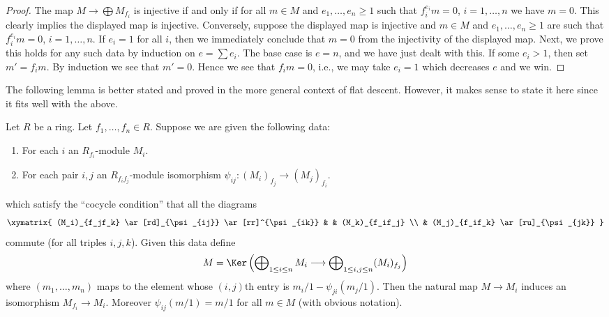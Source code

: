 \begin{proof}
The map $M \to \bigoplus M_{f_i}$ is injective if and only if
for all $m \in M$ and $e_1, \ldots, e_n \geq 1$ such that
$f_i^{e_i}m = 0$, $i = 1, \ldots, n$ we have $m = 0$.
This clearly implies the displayed map is injective.
Conversely, suppose the displayed map is injective and
$m \in M$ and $e_1, \ldots, e_n \geq 1$ are such that
$f_i^{e_i}m = 0$, $i = 1, \ldots, n$. If $e_i = 1$ for all $i$,
then we immediately conclude that $m = 0$ from the injectivity of
the displayed map. Next, we prove this holds for any such data
by induction on $e = \sum e_i$. The base case is $e = n$, and we have
just dealt with this. If some $e_i > 1$, then set $m' = f_im$.
By induction we see that $m' = 0$. Hence we see that $f_i m = 0$,
i.e., we may take $e_i = 1$ which decreases $e$ and we win.
\end{proof}

\noindent
The following lemma is better stated and proved in the more general
context of flat descent. However, it makes sense to state it here
since it fits well with the above.

\begin{lemma}
\label{lemma-glue-modules}
Let $R$ be a ring. Let $f_1, \ldots, f_n \in R$. Suppose we are given
the following data:
\begin{enumerate}
\item For each $i$ an $R_{f_i}$-module $M_i$.
\item For each pair $i, j$ an $R_{f_if_j}$-module isomorphism
$\psi_{ij} : (M_i)_{f_j} \to (M_j)_{f_i}$.
\end{enumerate}
which satisfy the ``cocycle condition'' that all the diagrams
$$
\xymatrix{
(M_i)_{f_jf_k}
\ar[rd]_{\psi_{ij}}
\ar[rr]^{\psi_{ik}}
& &
(M_k)_{f_if_j} \\
&
(M_j)_{f_if_k} \ar[ru]_{\psi_{jk}}
}
$$
commute (for all triples $i, j, k$). Given this data define
$$
M = \Ker\left(
\bigoplus\nolimits_{1 \leq i \leq n} M_i
\longrightarrow
\bigoplus\nolimits_{1 \leq i, j \leq n} (M_i)_{f_j}
\right)
$$
where $(m_1, \ldots, m_n)$ maps to the element whose
$(i, j)$th entry is $m_i/1 - \psi_{ji}(m_j/1)$.
Then the natural map $M \to M_i$ induces an isomorphism
$M_{f_i} \to M_i$. Moreover $\psi_{ij}(m/1) = m/1$
for all $m \in M$ (with obvious notation).
\end{lemma}

